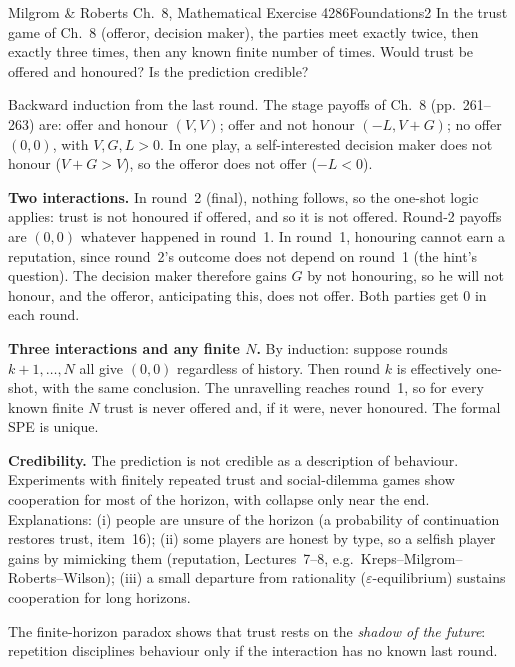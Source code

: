 \begin{exsol}{Milgrom \& Roberts Ch.~8, Mathematical Exercise 4}{286}{Foundations}{2}
\asked In the trust game of Ch.~8 (offeror, decision maker), the parties meet exactly twice, then exactly
three times, then any known finite number of times. Would trust be offered and honoured? Is the prediction
credible?

\method Backward induction from the last round. The stage payoffs of Ch.~8 (pp.~261--263) are: offer and
honour $(V, V)$; offer and not honour $(-L, V + G)$; no offer $(0, 0)$, with $V, G, L > 0$. In one
play, a self-interested decision maker does not honour ($V + G > V$), so the offeror does not offer
($-L < 0$).

\solution
\textbf{Two interactions.} In round~2 (final), nothing follows, so the one-shot logic applies: trust is not
honoured if offered, and so it is not offered. Round-2 payoffs are $(0,0)$ whatever happened in round~1.
In round~1, honouring cannot earn a reputation, since round~2's outcome does not depend on round~1
(the hint's question). The decision maker therefore gains $G$ by not honouring, so he will not honour,
and the offeror, anticipating this, does not offer. Both parties get $0$ in each round.

\textbf{Three interactions and any finite $N$.} By induction: suppose rounds $k+1, \dots, N$ all give
$(0,0)$ regardless of history. Then round $k$ is effectively one-shot, with the same conclusion. The
unravelling reaches round~1, so for every known finite $N$ trust is never offered and, if it were,
never honoured. The formal SPE is unique.

\textbf{Credibility.} The prediction is not credible as a description of behaviour. Experiments with
finitely repeated trust and social-dilemma games show cooperation for most of the horizon, with collapse
only near the end. Explanations: (i) people are unsure of the horizon (a probability of continuation
restores trust, item~16); (ii) some players are honest by type, so a selfish player gains by mimicking
them (reputation, Lectures~7--8, e.g.\ Kreps--Milgrom--Roberts--Wilson); (iii) a small departure from
rationality ($\varepsilon$-equilibrium) sustains cooperation for long horizons.

\interp The finite-horizon paradox shows that trust rests on the \emph{shadow of the future}: repetition
disciplines behaviour only if the interaction has no known last round.


\end{exsol}
